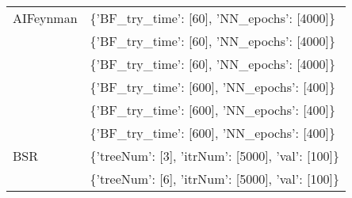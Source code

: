 \begin{tabular}{l p{37em}}
    AIFeynman &                                                                                                                                                                                                                                                                       \{'BF\_try\_time': [60], 'NN\_epochs': [4000]\} \\
              &                                                                                                                                                                                                                                                                       \{'BF\_try\_time': [60], 'NN\_epochs': [4000]\} \\
              &                                                                                                                                                                                                                                                                       \{'BF\_try\_time': [60], 'NN\_epochs': [4000]\} \\
              &                                                                                                                                                                                                                                                                       \{'BF\_try\_time': [600], 'NN\_epochs': [400]\} \\
              &                                                                                                                                                                                                                                                                       \{'BF\_try\_time': [600], 'NN\_epochs': [400]\} \\
              &                                                                                                                                                                                                                                                                       \{'BF\_try\_time': [600], 'NN\_epochs': [400]\} \\
          BSR &                                                                                                                                                                                                                                                                 \{'treeNum': [3], 'itrNum': [5000], 'val': [100]\} \\
              &                                                                                                                                                                                                                                                                 \{'treeNum': [6], 'itrNum': [5000], 'val': [100]\} \\

\end{tabular}
